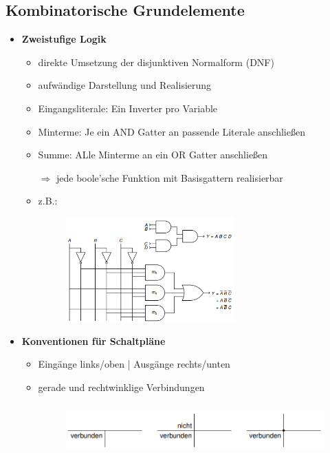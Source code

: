 \documentclass[11pt,a4paper]{article}
\begin{document}
\subsection{Kombinatorische Grundelemente}
\begin{itemize}

\item \textbf{Zweistufige Logik}
	\begin{itemize}
	\item direkte Umsetzung der disjunktiven Normalform (DNF)
	\item aufwändige Darstellung und Realisierung
	\item Eingangsliterale: Ein Inverter pro Variable
	\item Minterme: Je ein AND Gatter an passende Literale anschließen
	\item Summe: ALle Minterme an ein OR Gatter anschließen
	\item[$\Rightarrow$] jede boole'sche Funktion mit Basisgattern realisierbar
	\item z.B.:
	\item[] \begin{figure}[H]
				\begin{center}
				\includegraphics[height=4cm]{Bilder/zweistufigelogik}
				\end{center}
			\end{figure}
	\end{itemize}

\item \textbf{Konventionen für Schaltpläne}
	\begin{itemize}
	\item Eingänge links/oben | Ausgänge rechts/unten
	\item gerade und rechtwinklige Verbindungen
	\item[] \begin{figure}[H]
				\begin{center}
				\includegraphics[height=2cm]{Bilder/konventionen}
				\end{center}
			\end{figure}
	\end{itemize}


\end{itemize}
\end{document}
